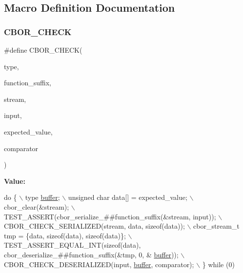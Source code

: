 \subsection{Macro Definition Documentation}
\mbox{\label{tests-cbor_8c_a65f1a265d0f7b6ec1a55c2784f6da274}} 
\subsubsection{\texorpdfstring{C\+B\+O\+R\+\_\+\+C\+H\+E\+CK}{CBOR\_CHECK}}
{\footnotesize\ttfamily \#define C\+B\+O\+R\+\_\+\+C\+H\+E\+CK(\begin{DoxyParamCaption}\item[{}]{type,  }\item[{}]{function\+\_\+suffix,  }\item[{}]{stream,  }\item[{}]{input,  }\item[{}]{expected\+\_\+value,  }\item[{}]{comparator }\end{DoxyParamCaption})}

{\bfseries Value\+:}
\begin{DoxyCode}
\textcolor{keywordflow}{do} \{ \(\backslash\)
    type \hyperlink{driver__sdcard__spi_2main_8c_a1870d2717147e1356f2eb4e5d5fa4a1c}{buffer}; \(\backslash\)
    unsigned \textcolor{keywordtype}{char} data[] = expected\_value; \(\backslash\)
    cbor\_clear(&stream); \(\backslash\)
    TEST\_ASSERT(cbor\_serialize\_##function\_suffix(&stream, input)); \(\backslash\)
    CBOR\_CHECK\_SERIALIZED(stream, data, \textcolor{keyword}{sizeof}(data)); \(\backslash\)
    cbor\_stream\_t tmp = \{data, \textcolor{keyword}{sizeof}(data), \textcolor{keyword}{sizeof}(data)\}; \(\backslash\)
    TEST\_ASSERT\_EQUAL\_INT(\textcolor{keyword}{sizeof}(data), cbor\_deserialize\_##function\_suffix(&tmp, 0, &
      \hyperlink{driver__sdcard__spi_2main_8c_a1870d2717147e1356f2eb4e5d5fa4a1c}{buffer})); \(\backslash\)
    CBOR\_CHECK\_DESERIALIZED(input, \hyperlink{driver__sdcard__spi_2main_8c_a1870d2717147e1356f2eb4e5d5fa4a1c}{buffer}, comparator); \(\backslash\)
\} \textcolor{keywordflow}{while} (0)
\end{DoxyCode}
\mbox{\label{tests-cbor_8c_aea260b48d92bb28a55f49063acec08f5}} 
